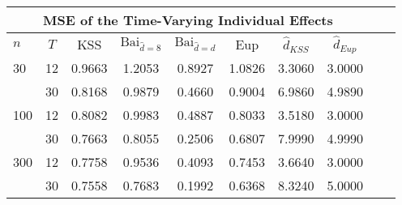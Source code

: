 \begin{tabular}{lccccccccc} 
\hline \multicolumn{8}{c}{MSE of the Time-Varying Individual Effects} \\ \hline 
$n$ & $T$ & KSS & $ \text{Bai}_{\hat{d} = 8}$ & $\text{Bai}_{\hat{d} = d}$ & Eup & $\hat{d}_{KSS}$ & $\hat{d}_{Eup}$ \\
\hline
30 & 12 &  0.9663  &  1.2053  &  0.8927  &  1.0826  &  3.3060  &  3.0000  \\
& 30 &  0.8168  &  0.9879  &  0.4660  &  0.9004  &  6.9860  &  4.9890  \\
100 & 12 &  0.8082  &  0.9983  &  0.4887  &  0.8033  &  3.5180  &  3.0000  \\
& 30 &  0.7663  &  0.8055  &  0.2506  &  0.6807  &  7.9990  &  4.9990  \\
300 & 12 &  0.7758  &  0.9536  &  0.4093  &  0.7453  &  3.6640  &  3.0000  \\
& 30 &  0.7558  &  0.7683  &  0.1992  &  0.6368  &  8.3240  &  5.0000  \\
\end{tabular} 
